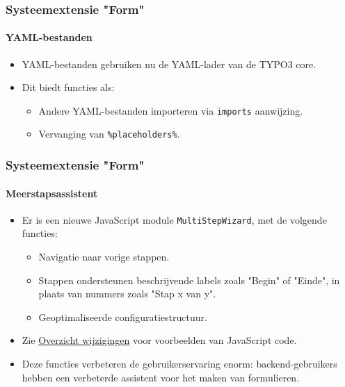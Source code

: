 
\begin{frame}[fragile]
	\frametitle{Systeemextensie "Form"}
	\framesubtitle{YAML-bestanden}

	\begin{itemize}
		\item YAML-bestanden gebruiken nu de YAML-lader van de TYPO3 core.
		\item Dit biedt functies als:

			\begin{itemize}
				\item Andere YAML-bestanden importeren via \texttt{imports} aanwijzing.
				\item Vervanging van \texttt{\%placeholders\%}.
			\end{itemize}

	\end{itemize}

\end{frame}


\begin{frame}[fragile]
	\frametitle{Systeemextensie "Form"}
	\framesubtitle{Meerstapsassistent}

	\begin{itemize}
		\item Er is een nieuwe JavaScript module \texttt{MultiStepWizard},
			met de volgende functies:

			\begin{itemize}
				\item Navigatie naar vorige stappen.
				\item Stappen ondersteunen beschrijvende labels zoals "Begin" of "Einde", in plaats van nummers zoals "Stap x van y".
				\item Geoptimaliseerde configuratiestructuur.
			\end{itemize}

		\item Zie \href{https://docs.typo3.org/c/typo3/cms-core/master/en-us/Changelog/10.2/Feature-79445-AddMultistepWizard.html}{Overzicht wijzigingen}
			voor voorbeelden van JavaScript code.

		\item Deze functies verbeteren de gebruikerservaring enorm: backend-gebruikers hebben een verbeterde assistent voor het maken van formulieren.

	\end{itemize}

\end{frame}

